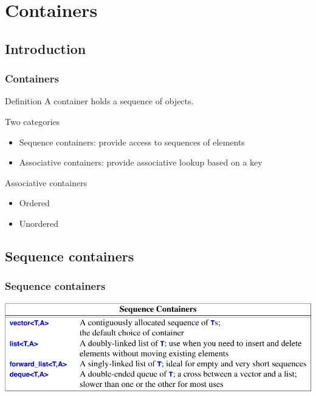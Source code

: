 \section{Containers}
\subsection{Introduction}
\begin{frame}
  \frametitle{Containers}
  \begin{block}{Definition}
    A container holds a sequence of objects.
  \end{block}
  \vfill
  \begin{block}{Two categories}
    \begin{itemize}
    \item Sequence containers: provide access to sequences of elements
    \item Associative containers: provide associative lookup based on a key
    \end{itemize}
  \end{block}
  \vfill
  \begin{block}{Associative containers}
    \begin{itemize}
    \item Ordered
    \item Unordered
    \end{itemize}
  \end{block}
\end{frame}

\subsection{Sequence containers}
\begin{frame}
  \frametitle{Sequence containers}
  \centering
  \includegraphics[width=\textwidth]{img/sequence_containers.png}
\end{frame}


